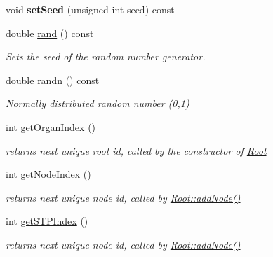 \begin{DoxyCompactItemize}
\mbox{\label{classCPlantBox_1_1Plant_a80f467832bacbb5ad23435c38b9dd0ee}} 
void {\bfseries set\+Seed} (unsigned int seed) const
\item 
double \hyperlink{classCPlantBox_1_1Plant_a026e40b062913144566ab022302916a2}{rand} () const
\begin{DoxyCompactList}\small\item\em Sets the seed of the random number generator. \end{DoxyCompactList}\item 
\mbox{\label{classCPlantBox_1_1Plant_a12c26191d1bf89868446e49ce366ad55}} 
double \hyperlink{classCPlantBox_1_1Plant_a12c26191d1bf89868446e49ce366ad55}{randn} () const
\begin{DoxyCompactList}\small\item\em Normally distributed random number (0,1) \end{DoxyCompactList}\item 
\mbox{\label{classCPlantBox_1_1Plant_ad9d2d1b71ea55623596c35848ca1abd9}} 
int \hyperlink{classCPlantBox_1_1Plant_ad9d2d1b71ea55623596c35848ca1abd9}{get\+Organ\+Index} ()
\begin{DoxyCompactList}\small\item\em returns next unique root id, called by the constructor of \hyperlink{classCPlantBox_1_1Root}{Root} \end{DoxyCompactList}\item 
\mbox{\label{classCPlantBox_1_1Plant_a56a333897348adc99b15deb33147e7a9}} 
int \hyperlink{classCPlantBox_1_1Plant_a56a333897348adc99b15deb33147e7a9}{get\+Node\+Index} ()
\begin{DoxyCompactList}\small\item\em returns next unique node id, called by \hyperlink{classCPlantBox_1_1Root_aa527dd6491af6dec3a3016eef66acc40}{Root\+::add\+Node()} \end{DoxyCompactList}\item 
\mbox{\label{classCPlantBox_1_1Plant_a08a9b40dfae0e40e0dc7f0a93240e55f}} 
int \hyperlink{classCPlantBox_1_1Plant_a08a9b40dfae0e40e0dc7f0a93240e55f}{get\+S\+T\+P\+Index} ()
\begin{DoxyCompactList}\small\item\em returns next unique node id, called by \hyperlink{classCPlantBox_1_1Root_aa527dd6491af6dec3a3016eef66acc40}{Root\+::add\+Node()} \end{DoxyCompactList}\item 

\end{DoxyCompactItemize}
